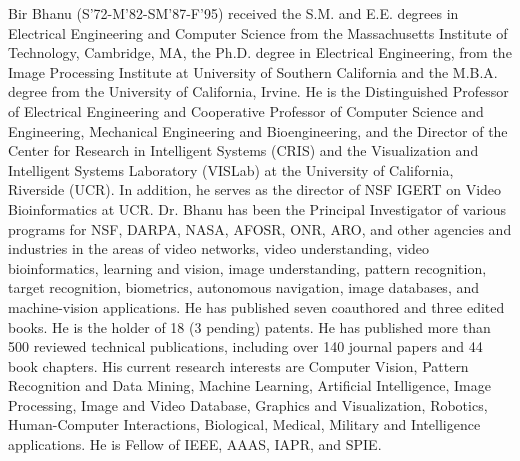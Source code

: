 \documentclass[10pt,journal]{IEEEtran}
\begin{document}
\begin{IEEEbiography}{Bir Bhanu}
(S'72-M'82-SM'87-F'95) received the S.M. and E.E. degrees in Electrical Engineering and Computer Science from the Massachusetts Institute of Technology, Cambridge, MA, the Ph.D. degree in Electrical Engineering, from the Image Processing Institute at University of Southern California and the M.B.A. degree from the University of California, Irvine. He is the Distinguished Professor of Electrical Engineering and Cooperative Professor of Computer Science and Engineering, Mechanical Engineering and Bioengineering, and the Director of the Center for Research in Intelligent Systems (CRIS) and the Visualization and Intelligent Systems Laboratory (VISLab) at the University of California, Riverside (UCR). In addition, he serves as the director of NSF IGERT on Video Bioinformatics at UCR. Dr. Bhanu has been the Principal Investigator of various programs for NSF, DARPA, NASA, AFOSR, ONR, ARO, and other agencies and industries in the areas of video networks, video understanding, video bioinformatics, learning and vision, image understanding, pattern recognition, target recognition, biometrics, autonomous navigation, image databases, and machine-vision applications. He has published seven coauthored and three edited books. He is the holder of 18 (3 pending) patents. He has published more than 500 reviewed technical publications, including over 140 journal papers and 44 book chapters. His current research interests are Computer Vision, Pattern Recognition and Data Mining, Machine Learning, Artificial Intelligence, Image Processing, Image and Video Database, Graphics and Visualization, Robotics, Human-Computer Interactions, Biological, Medical, Military and Intelligence applications. He is Fellow of IEEE, AAAS, IAPR, and SPIE.
\end{IEEEbiography}









\end{document}
